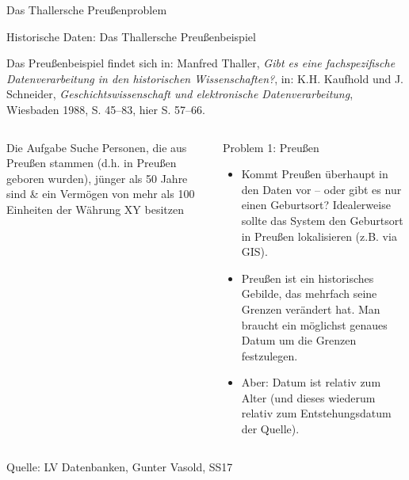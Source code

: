 \begin{frame}[allowframebreaks]{Das Thallersche Preußenproblem}

\alert{Historische Daten: Das Thallersche Preußenbeispiel} \\
{\scriptsize
Das Preußenbeispiel findet sich in: Manfred Thaller, \emph{Gibt es eine fachspezifische
Datenverarbeitung in den historischen Wissenschaften?}, in: K.H. Kaufhold und J.
Schneider, \emph{Geschichtswissenschaft und elektronische Datenverarbeitung},
Wiesbaden 1988, S. 45--83, hier S. 57--66.

}

\begin{columns}
  \begin{exampleblock}{Die Aufgabe}\footnotesize
  Suche Personen, die aus Preußen stammen (d.h. in Preußen geboren wurden), jünger als 50 Jahre sind \& ein Vermögen von mehr als 100 Einheiten der Währung XY besitzen
  \end{exampleblock}
  \begin{alertblock}{Problem 1: Preußen}\scriptsize
  \begin{itemize}
      \item Kommt Preußen überhaupt in den Daten vor -- oder gibt es nur einen Geburtsort? Idealerweise sollte das System den Geburtsort in Preußen lokalisieren (z.B. via GIS).
      \item Preußen ist ein historisches Gebilde, das mehrfach seine Grenzen verändert hat. Man braucht ein möglichst genaues Datum um die Grenzen festzulegen.
      \item Aber: Datum ist relativ zum Alter (und dieses wiederum relativ zum Entstehungsdatum der Quelle).
  \end{itemize}
  \end{alertblock}
\end{columns}

{\scriptsize\flushright Quelle: LV Datenbanken, Gunter Vasold, SS17

}

\framebreak 


\end{frame}
